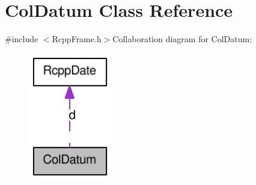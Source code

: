 \hypertarget{classColDatum}{
\section{ColDatum Class Reference}
\label{classColDatum}
}


{\ttfamily \#include $<$RcppFrame.h$>$}Collaboration diagram for ColDatum:\nopagebreak
\begin{figure}[H]
\begin{center}
\leavevmode
\includegraphics[width=102pt]{classColDatum__coll__graph}
\end{center}
\end{figure}
